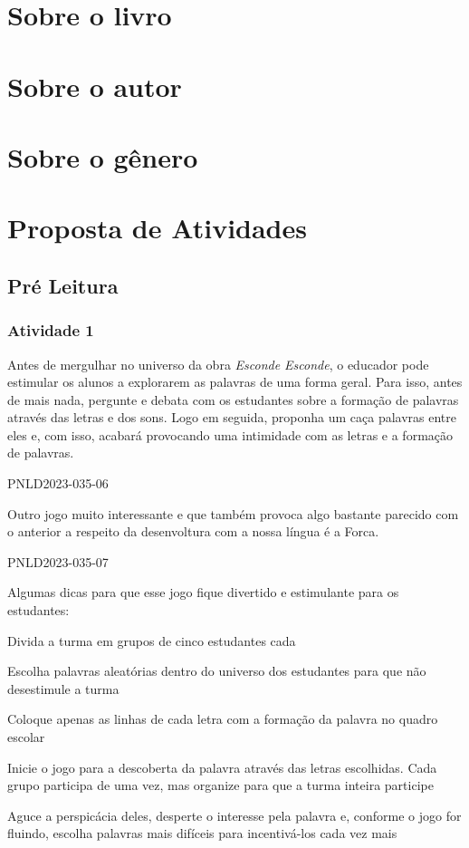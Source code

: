 \documentclass[11pt]{extarticle}
\begin{document}
\section{Sobre o livro}

\section{Sobre o autor}

\section{Sobre o gênero}

\section{Proposta de Atividades}
\subsection{Pré Leitura}
\subsubsection{Atividade 1}


Antes de mergulhar no universo da obra \textit{Esconde Esconde}, o educador pode estimular os alunos a explorarem as palavras de uma forma geral. Para isso, antes de mais nada, pergunte e debata com os estudantes sobre a formação de palavras através das letras e dos sons. Logo em seguida, proponha um caça palavras entre eles e, com isso, acabará provocando uma intimidade com as letras e a formação de palavras. 

PNLD2023-035-06


Outro jogo muito interessante e que também provoca algo bastante parecido com o anterior a respeito da desenvoltura com a nossa língua é a Forca. 

PNLD2023-035-07

Algumas dicas para que esse jogo fique divertido e estimulante para os estudantes: 

\item Divida a turma em grupos de cinco estudantes cada
\item Escolha palavras aleatórias dentro do universo dos estudantes para que não desestimule a turma
\item Coloque apenas as linhas de cada letra com a formação da palavra no quadro escolar
\item Inicie o jogo para a descoberta da palavra através das letras escolhidas. Cada grupo participa de uma vez, mas organize para que a turma inteira participe
\item Aguce a perspicácia deles, desperte o interesse pela palavra e, conforme o jogo for fluindo, escolha palavras mais difíceis para incentivá-los cada vez mais
\end{document}
